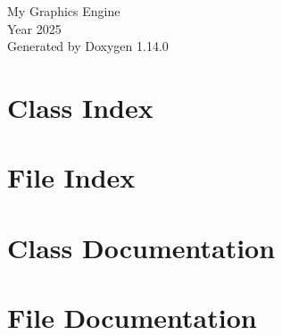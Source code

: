 \documentclass[twoside]{book}
\newcommand{\+}{\discretionary{\mbox{\scriptsize$\hookleftarrow$}}{}{}}
\newcommand{\clearemptydoublepage}{%
    \newpage{\pagestyle{empty}\cleardoublepage}%
  }
\begin{document}
  \raggedbottom
    \hypersetup{pageanchor=false,
                bookmarksnumbered=true,
                pdfencoding=unicode
               }
  \begin{titlepage}
  \vspace*{7cm}
  \begin{center}%
  {\Large My Graphics Engine}\\
  [1ex]\large Year 2025 \\
  \vspace*{1cm}
  {\large Generated by Doxygen 1.14.0}\\
  \end{center}
  \end{titlepage}
  \clearemptydoublepage
  \tableofcontents
  \clearemptydoublepage
  \hypersetup{pageanchor=true}
\chapter{Class Index}

\chapter{File Index}

\chapter{Class Documentation}


\chapter{File Documentation}



  \backmatter
  \newpage
  \clearemptydoublepage
  \printindex
\end{document}
